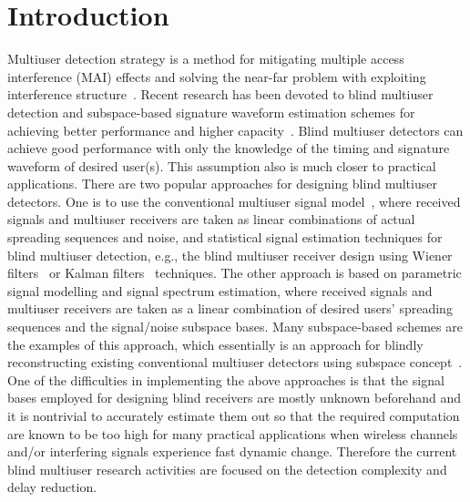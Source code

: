 \documentclass[a4paper,10pt,fleqn, twocolumn]{IEEETran}
\begin{document}
\section{Introduction}
Multiuser detection strategy is a method for mitigating multiple
access interference (MAI) effects and solving the near-far problem
with exploiting interference structure~\cite{Verd98}. Recent
research has been devoted to blind multiuser detection and
subspace-based signature waveform estimation schemes for achieving
better performance and higher
capacity~\cite{Madh94,Honi95,Torl97,Wang98,Wang99,Zhang02}. Blind
multiuser detectors can achieve good performance with only the
knowledge of the timing and signature waveform of desired user(s).
This assumption also is much closer to practical applications.
There are two popular approaches for designing blind multiuser
detectors. One is to use the conventional multiuser signal
model~\cite{Verd98}, where received signals and multiuser
receivers are taken as linear combinations of actual spreading
sequences and noise, and statistical signal estimation techniques
for blind multiuser detection, e.g., the blind multiuser receiver
design using Wiener filters~\cite{Madh94,Honi95} or Kalman
filters~\cite{Zhang02} techniques. The other approach is based on
parametric signal modelling and signal spectrum estimation, where
received signals and multiuser receivers are taken as a linear
combination of desired users' spreading sequences and the
signal/noise subspace bases. Many subspace-based schemes are the
examples of this approach, which essentially is an approach for
blindly reconstructing existing conventional multiuser detectors
using subspace concept~\cite{Wang98,Wang99}. One of the
difficulties in implementing the above approaches is that the
signal bases employed for designing blind receivers are mostly
unknown beforehand and it is nontrivial to accurately estimate
them out so that the required computation are known to be too high
for many practical applications when wireless channels and/or
interfering signals experience fast dynamic change. Therefore the
current blind multiuser research activities are focused on the
detection complexity and delay reduction.
\end{document}
